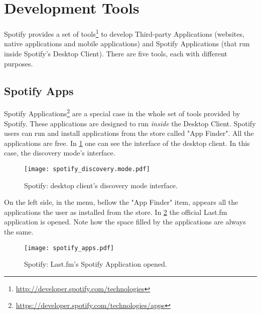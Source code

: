 

  \section{Development Tools} %
  \label{sec:devtools}
  
    Spotify provides a set of tools\footnote{\url{http://developer.spotify.com/technologies}} to develop Third-party Applications (websites, native applications and mobile applications) and Spotify Applications (that run inside Spotify's Desktop Client).
    There are five tools, each with different purposes.

    \subsection{Spotify Apps} %
    \label{sub:spotify_apps}
      Spotify Applications\footnote{\url{https://developer.spotify.com/technologies/apps}} are a special case in the whole set of tools provided by Spotify.
      These applications are designed to run \emph{inside} the Desktop Client.
      Spotify users can run and install applications from the store called "App Finder".
      All the applications are free.
      In \ref{fig:spotify_apps} one can see the interface of the desktop client.
      In this case, the discovery mode's interface.
      \begin{figure}
        \begin{center}
          \texttt{[image: spotify\_discovery.mode.pdf]}
        \end{center}
        \caption{Spotify: desktop client's discovery mode interface.}
        \label{fig:spotify_apps}
      \end{figure}
      On the left side, in the menu, bellow the "App Finder" item, appears all the applications the user as installed from the store.
      In \ref{fig:spotify_apps2} the official Last.fm application is opened.
      Note how the space filled by the applications are always the same.

      \begin{figure}
        \begin{center}
          \texttt{[image: spotify\_apps.pdf]}
        \end{center}
        \caption{Spotify: Last.fm's Spotify Application opened.}
        \label{fig:spotify_apps2}
      \end{figure}

